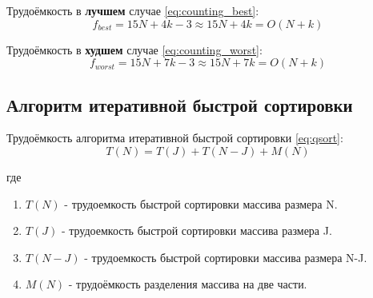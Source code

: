 Трудоёмкость в \textbf{лучшем} случае \eqref{eq:counting_best}:
\begin{equation}
    \label{eq:counting_best}
    f_{best} = 15N + 4k - 3 \approx 15N + 4k = O(N + k)
\end{equation}

Трудоёмкость в \textbf{худшем} случае \eqref{eq:counting_worst}:
\begin{equation}
    \label{eq:counting_worst}
    f_{worst} = 15N + 7k - 3 \approx 15N + 7k = O(N + k)
\end{equation}

\subsection{Алгоритм итеративной быстрой сортировки}

Трудоёмкость алгоритма итеративной быстрой сортировки \eqref{eq:qsort}:
\begin{equation}
    \label{eq:qsort}
    T(N) = T(J) + T(N-J) + M(N)
\end{equation}

где

\begin{enumerate}
    \item $T(N)$ - трудоемкость быстрой сортировки массива размера N.
    \item $T(J)$ - трудоемкость быстрой сортировки массива размера J.
    \item $T(N-J)$ - трудоемкость быстрой сортировки массива размера N-J.
    \item $M(N)$ - трудоёмкость разделения массива на две части.
\end{enumerate}


